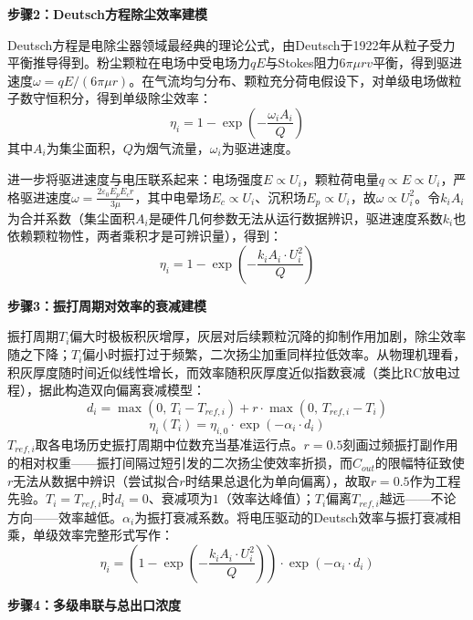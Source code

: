 \textbf{步骤2：Deutsch方程除尘效率建模}

Deutsch方程是电除尘器领域最经典的理论公式\cite{deutsch1922}，由Deutsch于1922年从粒子受力平衡推导得到。粉尘颗粒在电场中受电场力$qE$与Stokes阻力$6\pi\mu r v$平衡，得到驱进速度$\omega=qE/(6\pi\mu r)$。在气流均匀分布、颗粒充分荷电假设下，对单级电场做粒子数守恒积分，得到单级除尘效率：
\begin{equation}
    \eta_i = 1 - \exp\left(-\frac{\omega_i A_i}{Q}\right)
\end{equation}
其中$A_i$为集尘面积，$Q$为烟气流量，$\omega_i$为驱进速度。

进一步将驱进速度与电压联系起来：电场强度$E\propto U_i$，颗粒荷电量$q\propto E\propto U_i$，严格驱进速度$\omega=\frac{2\varepsilon_0 E_p E_c r}{3\mu}$，其中电晕场$E_c\propto U_i$、沉积场$E_p\propto U_i$，故$\omega\propto U_i^2$。令$k_iA_i$为合并系数（集尘面积$A_i$是硬件几何参数无法从运行数据辨识，驱进速度系数$k_i$也依赖颗粒物性，两者乘积才是可辨识量），得到：
\begin{equation}
    \eta_i = 1 - \exp\left(-\frac{k_i A_i \cdot U_i^2}{Q}\right)
\end{equation}

\textbf{步骤3：振打周期对效率的衰减建模}

振打周期$T_i$偏大时极板积灰增厚，灰层对后续颗粒沉降的抑制作用加剧，除尘效率随之下降；$T_i$偏小时振打过于频繁，二次扬尘加重同样拉低效率。从物理机理看，积灰厚度随时间近似线性增长，而效率随积灰厚度近似指数衰减（类比RC放电过程），据此构造双向偏离衰减模型：
\begin{equation}
    d_i = \max(0,\, T_i - T_{ref,i}) + r \cdot \max(0,\, T_{ref,i} - T_i)
\end{equation}
\begin{equation}
    \eta_i(T_i) = \eta_{i,0} \cdot \exp(-\alpha_i \cdot d_i)
\end{equation}
$T_{ref,i}$取各电场历史振打周期中位数充当基准运行点。$r=0.5$刻画过频振打副作用的相对权重——振打间隔过短引发的二次扬尘使效率折损，而$C_{out}$的限幅特征致使$r$无法从数据中辨识（尝试拟合$r$时结果总退化为单向偏离），故取$r=0.5$作为工程先验。$T_i=T_{ref,i}$时$d_i=0$、衰减项为$1$（效率达峰值）；$T_i$偏离$T_{ref,i}$越远——不论方向——效率越低。$\alpha_i$为振打衰减系数。将电压驱动的Deutsch效率与振打衰减相乘，单级效率完整形式写作：
\begin{equation}
    \eta_i = \left(1 - \exp\left(-\frac{k_i A_i \cdot U_i^2}{Q}\right)\right)\cdot \exp(-\alpha_i \cdot d_i)
\end{equation}

\textbf{步骤4：多级串联与总出口浓度}

